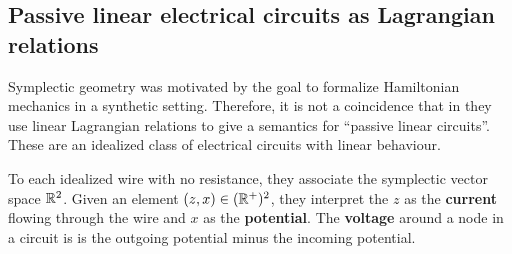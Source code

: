 \subsection{Passive linear electrical circuits as Lagrangian relations}
Symplectic geometry was motivated by the goal to formalize Hamiltonian mechanics in a synthetic setting.  
Therefore, it is not a coincidence that in \cite{passive} they use linear Lagrangian relations to give a semantics for ``passive linear circuits''.  These are an idealized class of electrical circuits with linear behaviour.


To each idealized wire with no resistance, they associate the symplectic vector space $\mathbb{R}^{2}$.  Given an element $(z,x) \in (\mathbb{R}^+)^2$,  they interpret the $z$ as the {\bf current} flowing through the wire and $x$ as the {\bf potential}. The {\bf voltage} around a node in a circuit is is the outgoing potential minus the incoming potential.

